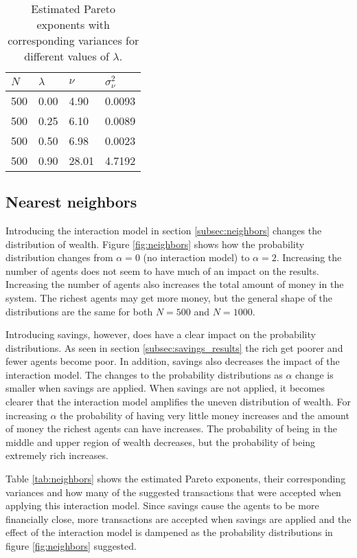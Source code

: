 \documentclass{article}
\begin{document}
\begin{table}
\centering
\caption{Estimated Pareto exponents with corresponding variances for different values of $\lambda$. }
\label{tab:savings_nu}
\begin{tabularx}{\textwidth}{X X X X}
\hline
$N$ & $\lambda$ & $\nu$ & $\sigma_{\nu}^2$\\
\hline\hline
500 & 0.00 & 4.90 & 0.0093 \\
500 & 0.25 & 6.10 & 0.0089 \\
500 & 0.50 & 6.98 & 0.0023 \\
500 & 0.90 & 28.01 & 4.7192 \\
\hline
\end{tabularx}
\end{table}


\FloatBarrier
\subsection{Nearest neighbors}
\label{subsec:neighbors_results}
Introducing the interaction model in section \ref{subsec:neighbors} changes the distribution of wealth. Figure \ref{fig:neighbors} shows how the probability distribution changes from $\alpha=0$ (no interaction model) to $\alpha=2$. Increasing the number of agents does not seem to have much of an impact on the results. Increasing the number of agents also increases the total amount of money in the system. The richest agents may get more money, but the general shape of the distributions are the same for both $N=500$ and $N=1000$. 

Introducing savings, however, does have a clear impact on the probability distributions. As seen in section \ref{subsec:savings_results} the rich get poorer and fewer agents become poor. In addition, savings also decreases the impact of the interaction model. The changes to the probability distributions as $\alpha$ change is smaller when savings are applied. When savings are not applied, it becomes clearer that the interaction model amplifies the uneven distribution of wealth. For increasing $\alpha$ the probability of having very little money increases and the amount of money the richest agents can have increases. The probability of being in the middle and upper region of wealth decreases, but the probability of being extremely rich increases. 

Table \ref{tab:neighbors} shows the estimated Pareto exponents, their corresponding variances and how many of the suggested transactions that were accepted when applying this interaction model. Since savings cause the agents to be more financially close, more transactions are accepted when savings are applied and the effect of the interaction model is dampened as the probability distributions in figure \ref{fig:neighbors} suggested. 
\end{document}
